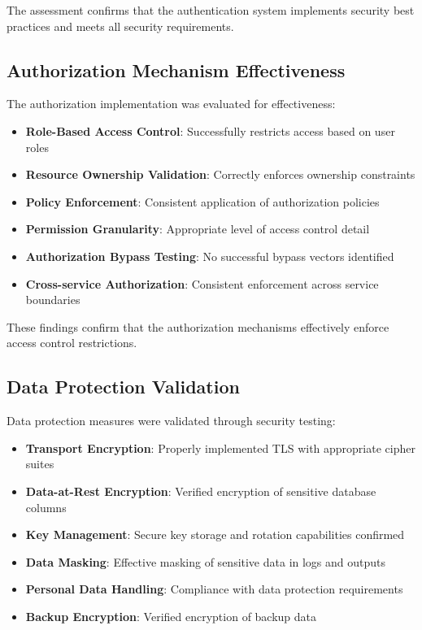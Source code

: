 The assessment confirms that the authentication system implements security best practices and meets all security requirements.

\subsection{Authorization Mechanism Effectiveness}

The authorization implementation was evaluated for effectiveness:

\begin{itemize}
    \item \textbf{Role-Based Access Control}: Successfully restricts access based on user roles
    \item \textbf{Resource Ownership Validation}: Correctly enforces ownership constraints
    \item \textbf{Policy Enforcement}: Consistent application of authorization policies
    \item \textbf{Permission Granularity}: Appropriate level of access control detail
    \item \textbf{Authorization Bypass Testing}: No successful bypass vectors identified
    \item \textbf{Cross-service Authorization}: Consistent enforcement across service boundaries
\end{itemize}

These findings confirm that the authorization mechanisms effectively enforce access control restrictions.

\subsection{Data Protection Validation}

Data protection measures were validated through security testing:

\begin{itemize}
    \item \textbf{Transport Encryption}: Properly implemented TLS with appropriate cipher suites
    \item \textbf{Data-at-Rest Encryption}: Verified encryption of sensitive database columns
    \item \textbf{Key Management}: Secure key storage and rotation capabilities confirmed
    \item \textbf{Data Masking}: Effective masking of sensitive data in logs and outputs
    \item \textbf{Personal Data Handling}: Compliance with data protection requirements
    \item \textbf{Backup Encryption}: Verified encryption of backup data
\end{itemize}

